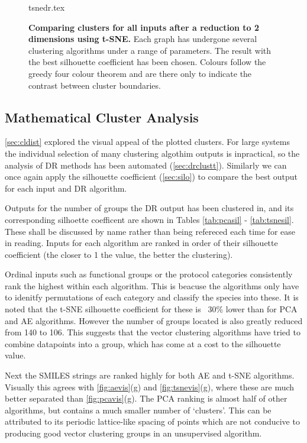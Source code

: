 \begin{landscape}
\begin{figure}[H]
    {tsnedr.tex}
    \caption{\textbf{Comparing clusters for all inputs after a reduction to 2 dimensions using t-SNE.}
    Each graph has undergone several clustering algorithms under a range of parameters. The result with the best silhouette coefficient has been chosen. Colours follow the greedy four colour theorem and are there only to indicate the contrast between cluster boundaries.}
    \label{fig:tsnevis}
\end{figure}
\end{landscape}



\subsection{Mathematical Cluster Analysis}\label{sec:mathclustanalysis}

\autoref{sec:cldist} explored the visual appeal of the plotted clusters. For large systems the individual selection of many clustering algothim outputs is inpractical, so the analysis of DR methods has been automated (\autoref{sec:drclustt}). Similarly we can once again apply the silhouette coefficient (\autoref{sec:silo})
to compare the best output for each input and DR algorithm.

Outputs for the number of groups the DR output has been clustered in, and its corresponding silhoette coefficent are shown in Tables \ref{tab:pcasil} - \ref{tab:tsnesil}. These shall be discussed by name rather than being refereced each time for ease in reading.
Inputs for each algorithm are ranked in order of their silhouette coefficient (the closer to 1 the value, the better the clustering).

Ordinal inputs such as functional groups or the protocol categories consistently rank the highest within each algorithm. This is beacuse the algorithms only have to idenitfy permutations of each category and classify the species into these. It is noted that the t-SNE silhouette coefficient for these is ~30\% lower than for PCA and AE algorithms. However the number of groups located is also greatly reduced from 140 to 106. This suggests that the vector clustering algorithms have tried to combine datapoints into a group, which has come at a cost to the silhouette value.

Next the SMILES strings are ranked highly for both AE and t-SNE algorithms. Visually this agrees with \autoref{fig:aevis}(g) and \autoref{fig:tsnevis}(g), where these are much better separated than \autoref{fig:pcavis}(g). The PCA ranking is almost half of other algorithms, but contains a much smaller number of `clusters'. This can be attributed to its periodic lattice-like spacing of points which are not conducive to producing good vector clustering groups in an unsupervised algorithm.


